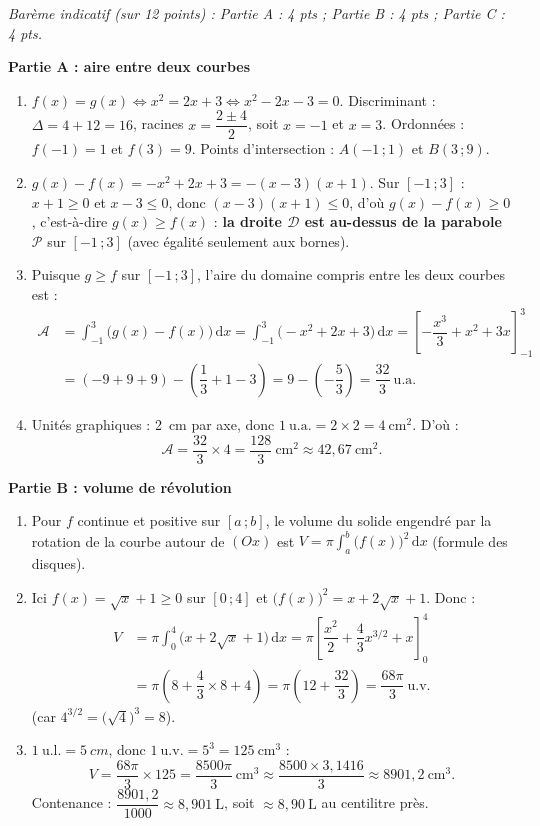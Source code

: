 \documentclass[11pt]{article}
\begin{document}
\begin{corrige}
\emph{Barème indicatif (sur 12 points) : Partie A : 4 pts ; Partie B : 4 pts ; Partie C : 4 pts.}

\textbf{Partie A : aire entre deux courbes}
\begin{enumerate}
\item $f(x)=g(x) \Leftrightarrow x^2 = 2x+3 \Leftrightarrow x^2-2x-3=0$. Discriminant : $\Delta = 4+12 = 16$, racines $x=\dfrac{2\pm 4}{2}$, soit $x=-1$ et $x=3$.
Ordonnées : $f(-1)=1$ et $f(3)=9$. Points d'intersection : $\boxed{A(-1\,;1)}$ et $\boxed{B(3\,;9)}$.
\item $g(x)-f(x) = -x^2+2x+3 = -(x-3)(x+1)$. Sur $[-1\,;3]$ : $x+1\ge 0$ et $x-3\le 0$, donc $(x-3)(x+1)\le 0$, d'où $g(x)-f(x)\ge 0$, c'est-à-dire $g(x)\ge f(x)$ : \textbf{la droite $\mathcal{D}$ est au-dessus de la parabole $\mathcal{P}$} sur $[-1\,;3]$ (avec égalité seulement aux bornes).
\item Puisque $g\ge f$ sur $[-1\,;3]$, l'aire du domaine compris entre les deux courbes est :
\begin{align*}
\mathcal{A} &= \int_{-1}^{3}\big(g(x)-f(x)\big)\,\mathrm{d}x = \int_{-1}^{3}\big(-x^2+2x+3\big)\,\mathrm{d}x = \left[-\dfrac{x^3}{3}+x^2+3x\right]_{-1}^{3}\\
&= \left(-9+9+9\right) - \left(\dfrac{1}{3}+1-3\right) = 9 - \left(-\dfrac{5}{3}\right) = \boxed{\dfrac{32}{3}\ \text{u.a.}}
\end{align*}
\item Unités graphiques : \SI{2}{cm} par axe, donc $1\ \text{u.a.} = 2\times 2 = 4\ \mathrm{cm}^2$. D'où :
\[
\mathcal{A} = \dfrac{32}{3}\times 4 = \boxed{\dfrac{128}{3}\ \mathrm{cm}^2 \approx 42{,}67\ \mathrm{cm}^2}.
\]
\end{enumerate}

\textbf{Partie B : volume de révolution}
\begin{enumerate}
\item Pour $f$ continue et positive sur $[a\,;b]$, le volume du solide engendré par la rotation de la courbe autour de $(Ox)$ est $V = \pi\displaystyle\int_a^b \big(f(x)\big)^2\,\mathrm{d}x$ (formule des disques).
\item Ici $f(x)=\sqrt{x}+1 \ge 0$ sur $[0\,;4]$ et $\big(f(x)\big)^2 = x+2\sqrt{x}+1$. Donc :
\begin{align*}
V &= \pi\int_0^4 \big(x+2\sqrt{x}+1\big)\,\mathrm{d}x = \pi\left[\dfrac{x^2}{2} + \dfrac{4}{3}x^{3/2} + x\right]_0^4\\
&= \pi\left(8 + \dfrac{4}{3}\times 8 + 4\right) = \pi\left(12+\dfrac{32}{3}\right) = \boxed{\dfrac{68\pi}{3}\ \text{u.v.}}
\end{align*}
(car $4^{3/2} = \big(\sqrt{4}\big)^3 = 8$).
\item $1\ \text{u.l.} = \SI{5}{cm}$, donc $1\ \text{u.v.} = 5^3 = 125\ \mathrm{cm}^3$ :
\[
V = \dfrac{68\pi}{3}\times 125 = \dfrac{8500\pi}{3}\ \mathrm{cm}^3 \approx \dfrac{8500\times 3{,}1416}{3} \approx 8901{,}2\ \mathrm{cm}^3.
\]
Contenance : $\dfrac{8901{,}2}{1000} \approx 8{,}901\ \mathrm{L}$, soit $\boxed{\approx 8{,}90\ \mathrm{L}}$ au centilitre près.
\end{enumerate}


\end{corrige}
\end{document}
